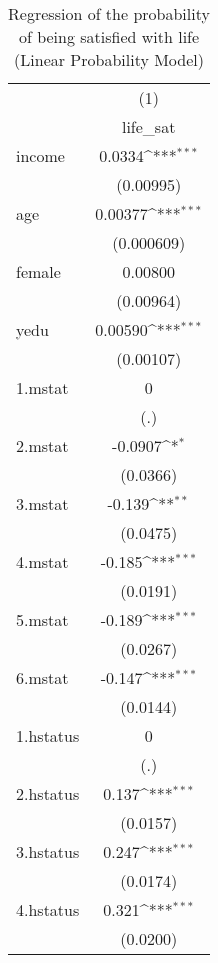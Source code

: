 \begin{table}[htbp]\centering
\def\sym#1{\ifmmode^{#1}\else\(^{#1}\)\fi}
\caption{Regression of the probability of being satisfied with life (Linear Probability Model)}
\begin{tabular}{l*{1}{c}}
\hline\hline
            &\multicolumn{1}{c}{(1)}\\
            &\multicolumn{1}{c}{life\_sat}\\
\hline
income      &      0.0334\sym{***}\\
            &   (0.00995)         \\
age         &     0.00377\sym{***}\\
            &  (0.000609)         \\
female      &     0.00800         \\
            &   (0.00964)         \\
yedu        &     0.00590\sym{***}\\
            &   (0.00107)         \\
1.mstat     &           0         \\
            &         (.)         \\
2.mstat     &     -0.0907\sym{*}  \\
            &    (0.0366)         \\
3.mstat     &      -0.139\sym{**} \\
            &    (0.0475)         \\
4.mstat     &      -0.185\sym{***}\\
            &    (0.0191)         \\
5.mstat     &      -0.189\sym{***}\\
            &    (0.0267)         \\
6.mstat     &      -0.147\sym{***}\\
            &    (0.0144)         \\
1.hstatus   &           0         \\
            &         (.)         \\
2.hstatus   &       0.137\sym{***}\\
            &    (0.0157)         \\
3.hstatus   &       0.247\sym{***}\\
            &    (0.0174)         \\
4.hstatus   &       0.321\sym{***}\\
            &    (0.0200)         \\

\end{tabular}
\end{table}
